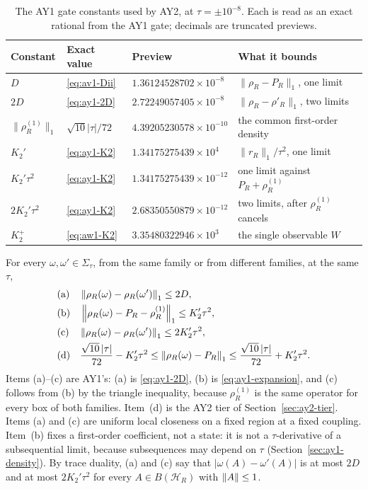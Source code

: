 \begin{table}[htbp]
\centering\small
\caption{The AY1 gate constants used by AY2, at $\tau=\pm10^{-8}$. Each is read
as an exact rational from the AY1 gate; decimals are truncated previews.}
\label{tab:ay2-constants}
\begin{tabular}{llll}
\toprule
Constant & Exact value & Preview & What it bounds\\
\midrule
$D$ & \eqref{eq:av1-Dii} & $1.36124528702\times10^{-8}$ & $\lVert \rho_R-P_R\rVert_1$, one limit\\
$2D$ & \eqref{eq:ay1-2D} & $2.72249057405\times10^{-8}$ & $\lVert \rho_R-\rho'_R\rVert_1$, two limits\\
$\lVert \rho^{(1)}_R\rVert_1$ & $\sqrt{10}|\tau|/72$ & $4.39205230578\times10^{-10}$ & the common first-order density\\
$K_2'$ & \eqref{eq:ay1-K2} & $1.34175275439\times10^{4}$ & $\lVert r_R\rVert_1/\tau^2$, one limit\\
$K_2'\tau^2$ & \eqref{eq:ay1-K2} & $1.34175275439\times10^{-12}$ & one limit against $P_R+\rho^{(1)}_R$\\
$2K_2'\tau^2$ & \eqref{eq:ay1-K2} & $2.68350550879\times10^{-12}$ & two limits, after $\rho^{(1)}_R$ cancels\\
$K_2^+$ & \eqref{eq:aw1-K2} & $3.35480322946\times10^{3}$ & the single observable $W$\\
\bottomrule
\end{tabular}
\end{table}

For every $\omega,\omega'\in\Sigma_\tau$, from the same family or from
different families, at the same $\tau$,
\begin{equation}
 \begin{aligned}
 &\text{(a)}\quad\left\lVert\rho_R(\omega)-\rho_R(\omega')\right\rVert_1\le2D,\\
 &\text{(b)}\quad\left\lVert\rho_R(\omega)-P_R-\rho^{(1)}_R\right\rVert_1\le K_2'\tau^2,\\
 &\text{(c)}\quad\left\lVert\rho_R(\omega)-\rho_R(\omega')\right\rVert_1\le2K_2'\tau^2,\\
 &\text{(d)}\quad\frac{\sqrt{10}\,|\tau|}{72}-K_2'\tau^2\le\left\lVert\rho_R(\omega)-P_R\right\rVert_1
 \le\frac{\sqrt{10}\,|\tau|}{72}+K_2'\tau^2 .
 \end{aligned}
 \label{eq:ay2-proved}
\end{equation}
Items (a)--(c) are AY1's: (a) is \eqref{eq:ay1-2D}, (b) is
\eqref{eq:ay1-expansion}, and (c) follows from (b) by the triangle inequality,
because $\rho^{(1)}_R$ is the same operator for every box of both families.
Item~(d) is the AY2 tier of Section~\ref{sec:ay2-tier}. Items (a) and (c) are
uniform local closeness on a fixed region at a fixed coupling. Item~(b) fixes
a first-order coefficient, not a state: it is not a $\tau$-derivative of a
subsequential limit, because subsequences may depend on $\tau$
(Section~\ref{sec:ay1-density}). By trace duality, (a) and (c) say that
$|\omega(A)-\omega'(A)|$ is at most $2D$ and at most $2K_2'\tau^2$ for every
$A\in B(\mathcal H_R)$ with $\left\lVert A\right\rVert\le1$.

